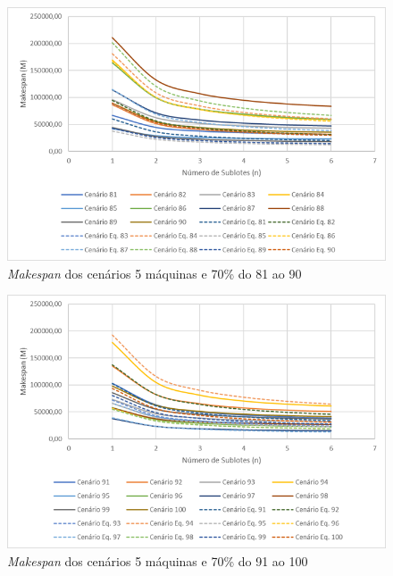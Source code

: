 \begin{figure}[H]
    \centering
    \includegraphics[width=13cm]{Apendices/Figuras/05m70_81-90}
    \caption{\textit{Makespan} dos cenários 5 máquinas e 70\% do 81 ao 90}
    \label{fig:05m70_81-90}
\end{figure}

\begin{figure}[H]
    \centering
    \includegraphics[width=13cm]{Apendices/Figuras/05m70_91-100}
    \caption{\textit{Makespan} dos cenários 5 máquinas e 70\% do 91 ao 100}
    \label{fig:05m70_91-100}
\end{figure}